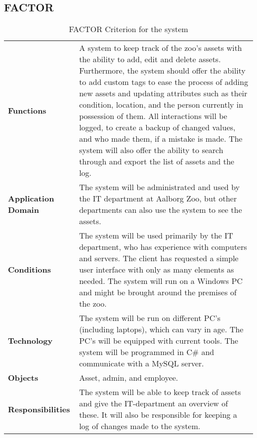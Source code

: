 \subsection*{FACTOR} \label{sec:factor}
\par
\begin{table}[H]
    \centering
    {
    \renewcommand{\arraystretch}{2.0}
    \begin{tabular}{ m{4cm} m{10cm} }
        \hline
        
        \textbf{Functions} & A system to keep track of the zoo's assets with the ability to add, edit and delete assets. Furthermore, the system should offer the ability to add custom tags to ease the process of adding new assets and updating attributes such as their condition, location, and the person currently in possession of them. All interactions will be logged, to create a backup of changed values, and who made them, if a mistake is made. The system will also offer the ability to search through and export the list of assets and the log.\\
        
        \textbf{Application Domain} & The system will be administrated and used by the IT department at Aalborg Zoo, but other departments can also use the system to see the assets.\\
        
        \textbf{Conditions} & The system will be used primarily by the IT department, who has experience with computers and servers. The client has requested a simple user interface with only as many elements as needed. The system will run on a Windows PC and might be brought around the premises of the zoo.\\
        
        \textbf{Technology} & The system will be run on different PC's (including laptops), which can vary in age. The PC's will be equipped with current tools. The system will be programmed in C\# and communicate with a MySQL server.\\
        
        \textbf{Objects} & Asset, admin, and employee.\\
        
        \textbf{Responsibilities} & The system will be able to keep track of assets and give the IT-department an overview of these. It will also be responsible for keeping a log of changes made to the system.\\
        
        \hline
    \end{tabular}
    \caption{FACTOR Criterion for the system}
    \label{tab:factor}
    }
\end{table}